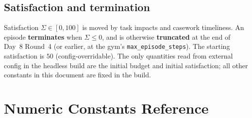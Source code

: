 \documentclass[11pt]{article}
\newcommand{\code}[1]{\texttt{\small #1}}
\begin{document}
\subsection{Satisfaction and termination}
Satisfaction $\Sigma \in [0,100]$ is moved by task impacts and casework
timeliness. An episode \textbf{terminates} when $\Sigma \leq 0$, and is otherwise
\textbf{truncated} at the end of Day~8 Round~4 (or earlier, at the gym's
\code{max\_episode\_steps}). The starting satisfaction is $50$
(config-overridable). The only quantities read from external config in the
headless build are the initial budget and initial satisfaction; all other
constants in this document are fixed in the build.

\appendix
\section{Numeric Constants Reference}
\label{app:constants}
\end{document}
